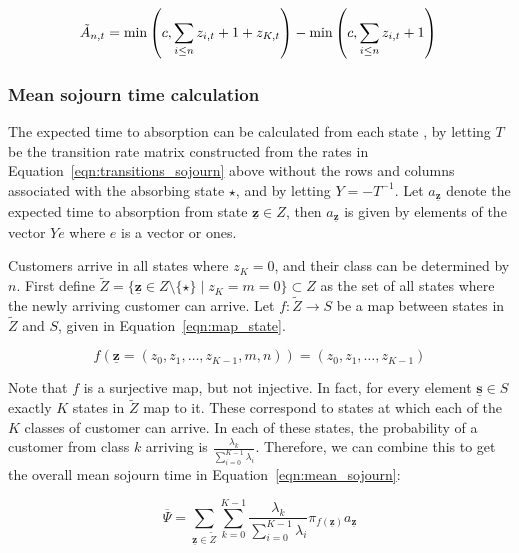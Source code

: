 \documentclass{article}
\begin{document}
\begin{equation}\label{eqn:inservice_adapt_tilde}
\tilde{A}_{n,t} =
\min\left(c, \sum_{i \leq n} z_{i,t} + 1 + z_{K,t}\right) - \min\left(c, \sum_{i \leq n} z_{i,t} + 1\right) \\
\end{equation}


\subsubsection{Mean sojourn time calculation}\label{sec:meansojourncalc}
The expected time to absorption can be calculated from each state
\cite{stewart09}, by letting $T$ be the transition rate matrix constructed from
the rates in Equation~\ref{eqn:transitions_sojourn} above without the rows and
columns associated with the absorbing state $\star$, and by letting
$Y = -T^{-1}$.
Let $a_{\underline{\mathbf{z}}}$ denote the expected time to absorption
from state $\underline{\mathbf{z}} \in Z$, then $a_{\underline{\mathbf{z}}}$ is
given by elements of the vector $Ye$ where $e$ is a vector or ones.

Customers arrive in all states where $z_K = 0$, and their class can be
determined by $n$. First define
$\tilde{Z} = \{\underline{\mathbf{z}} \in Z\setminus\{\star\} \; | \; z_K = m = 0\} \subset Z$
as the set of all states where the newly arriving customer can arrive.
Let $f: \tilde{Z} \rightarrow S$ be a map between states in $\tilde{Z}$ and $S$,
given in Equation~\ref{eqn:map_state}.

\begin{equation}\label{eqn:map_state}
f\left(\underline{\mathbf{z}} = (z_0, z_1, \dots, z_{K-1}, m, n) \right) = (z_0, z_1, \dots, z_{K-1})
\end{equation}

Note that $f$ is a surjective map, but not injective. In fact, for every element
$\underline{\mathbf{s}} \in S$ exactly $K$ states in $\tilde{Z}$ map to it.
These correspond to states at which each of the $K$ classes of customer can
arrive. In each of these states, the probability of a customer from class $k$
arriving is $\frac{\lambda_k}{\sum_{i=0}^{K-1} \lambda_i}$. Therefore, we can
combine this to get the overall mean sojourn time in
Equation~\ref{eqn:mean_sojourn}:

\begin{equation}\label{eqn:mean_sojourn}
\overline{\Psi} = \sum_{\underline{\mathbf{z}} \in \tilde{Z}} \sum_{k=0}^{K-1} \frac{\lambda_k}{\sum_{i=0}^{K-1} \lambda_i} \pi_{f(\underline{\mathbf{z}})} a_{\underline{\mathbf{z}}}
\end{equation}
\end{document}
